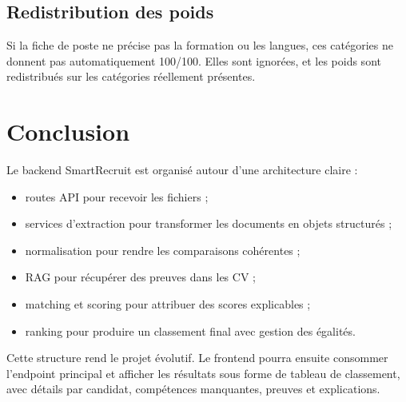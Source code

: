 \documentclass[12pt,a4paper]{report}
\begin{document}
\section{Redistribution des poids}

Si la fiche de poste ne précise pas la formation ou les langues, ces catégories ne donnent pas automatiquement 100/100. Elles sont ignorées, et les poids sont redistribués sur les catégories réellement présentes.

\chapter{Conclusion}

Le backend SmartRecruit est organisé autour d'une architecture claire :

\begin{itemize}
    \item routes API pour recevoir les fichiers ;
    \item services d'extraction pour transformer les documents en objets structurés ;
    \item normalisation pour rendre les comparaisons cohérentes ;
    \item RAG pour récupérer des preuves dans les CV ;
    \item matching et scoring pour attribuer des scores explicables ;
    \item ranking pour produire un classement final avec gestion des égalités.
\end{itemize}

Cette structure rend le projet évolutif. Le frontend pourra ensuite consommer l'endpoint principal et afficher les résultats sous forme de tableau de classement, avec détails par candidat, compétences manquantes, preuves et explications.
\end{document}
